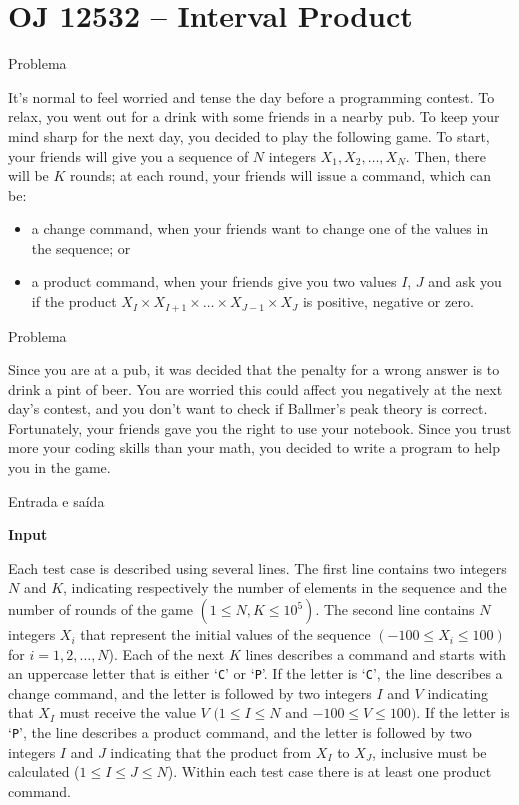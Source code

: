 \section{OJ 12532 -- Interval Product}

\begin{frame}[fragile]{Problema}

It’s normal to feel worried and tense the day before a programming contest. To relax, you went out 
for a drink with some friends in a nearby pub. To keep your mind sharp for the next day, you 
decided to play the following game. To start, your friends will give you a sequence of $N$ integers 
$X_1, X_2, \ldots, X_N$.  Then, there will be $K$ rounds; at each round, your friends will issue a 
command, which can be:
\begin{itemize}
    \item a change command, when your friends want to change one of the values in the sequence; or
    \item a product command, when your friends give you two values $I$, $J$ and ask you if the 
        product $X_I\times X_{I+1}\times \ldots\times X_{J-1}\times X_J$ is positive, negative or zero.
\end{itemize}

\end{frame}

\begin{frame}[fragile]{Problema}

Since you are at a pub, it was decided that the penalty for a wrong answer is to drink a pint of
beer. You are worried this could affect you negatively at the next day’s contest, and you don’t want
to check if Ballmer’s peak theory is correct. Fortunately, your friends gave you the right to use your
notebook. Since you trust more your coding skills than your math, you decided to write a program to
help you in the game.

\end{frame}

\begin{frame}[fragile]{Entrada e saída}

\textbf{Input}

Each test case is described using several lines. The first line contains two integers $N$ and $K$,
indicating respectively the number of elements in the sequence and the number of rounds of the game 
$(1\leq N, K\leq 10^5)$. 
The second line contains $N$ integers $X_i$ that represent the initial values of the sequence
$(-100\leq X_i\leq 100)$ for $i = 1, 2, \ldots, N$). Each of the next $K$ lines describes a command 
and starts with an uppercase letter that is either ‘\texttt{C}’ or ‘\texttt{P}’. 
If the letter is ‘\texttt{C}’, the line describes a change command, and the letter is followed by 
two integers $I$ and $V$ indicating that $X_I$ must receive the value $V$ $(1\leq I\leq N$ and 
$-100\leq V\leq 100)$. If the letter is ‘\texttt{P}’, the line describes a product command, and 
the letter is followed by two integers $I$ and $J$ indicating that the product from 
$X_I$ to $X_J$, inclusive must be calculated ($1\leq I\leq J\leq N$). Within each test case there 
is at least one product command.

\end{frame}

